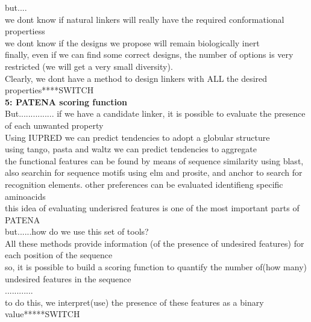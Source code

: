 \documentclass[a4paper,10pt]{article}
\begin{document}
but....\\
we dont know if natural linkers will really have the required conformational propertiess\\
we dont know if the designs we propose will remain biologically inert\\
finally, even if we can find some correct designs, the number of options is very restricted (we will get a very small diversity).\\

Clearly, we dont have a method to design linkers with ALL the desired properties****SWITCH\\


\textbf{5: PATENA scoring function}\\
But............... if we have a candidate linker, it is possible to evaluate the presence of each unwanted property\\

Using IUPRED we can predict tendencies to adopt a globular structure\\
using tango, pasta and waltz we can predict tendencies to aggregate\\
the functional features can be found by means of sequence similarity using blast, also searchin for sequence motifs using elm and prosite, and anchor to search for recognition elements.
other preferences can be evaluated identifieng specific aminoacids\\

this idea of evaluating underisred features is one of the most important parts of PATENA\\
but......how do we use this set of tools?\\
All these methods provide information (of the presence of undesired features) for each position of the sequence\\
so, it is possible to build a scoring function to quantify the number of(how many) undesired features in the sequence\\
............\\
to do this, we interpret(use) the presence of these features as a binary value*****SWITCH\\ 
\end{document}
